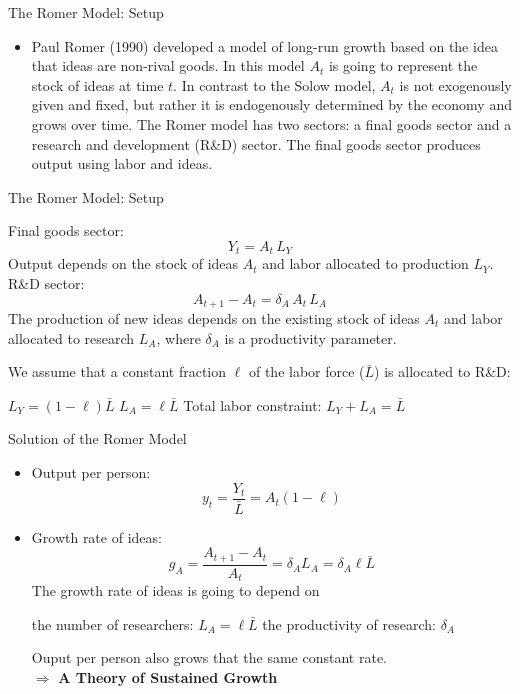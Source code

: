 \documentclass[10pt,aspectratio=169]{beamer}
\begin{document}
\begin{frame}{The Romer Model: Setup}
\begin{itemize}
    \item Paul Romer (1990) developed a model of long-run growth based on the idea that ideas are non-rival goods.
    \itemvso In this model $A_t$ is going to represent the stock of ideas at time $t$.
    \itemvso In contrast to the Solow model, $A_t$ is not exogenously given and fixed, but rather it is endogenously determined by the economy and grows over time.
    \itemvso The Romer model has two sectors: a final goods sector and a research and development (R\&D) sector.
    \itemvso The final goods sector produces output using labor and ideas.
\end{itemize}
\end{frame}

\begin{frame}{The Romer Model: Setup}
\begin{itemize}
    \itemvso Final goods sector:
     \[
        Y_t = A_t\,L_Y
    \]
    Output depends on the stock of ideas $A_t$ and labor allocated to production $L_Y$.
    \itemvso R\&D sector: 
    \[
        A_{t+1}-A_t = \delta_A\,A_t\,L_A
    \]
    The production of new ideas depends on the existing stock of ideas $A_t$ and labor allocated to research $L_A$, where $\delta_A$ is a productivity parameter.

    \itemvso We assume that a constant fraction $\ell$ of the labor force ($\bar{L}$) is allocated to R\&D:
    \begin{itemize}
        \itemvso $L_Y = (1-\ell)\bar{L}$
        \itemvso $L_A = \ell \bar{L}$
        \itemvso Total labor constraint: $L_Y + L_A = \bar{L}$
    \end{itemize}
\end{itemize}
\end{frame}


\begin{frame}{Solution of the Romer Model}
    \begin{itemize}
        \item Output per person:
        \[
        y_t = \frac{Y_t}{\bar{L}} = A_t (1-\ell)
        \]
        \item Growth rate of ideas:
        \[
        g_A = \frac{A_{t+1}-A_t}{A_t} = \delta_A L_A = \delta_A \ell \bar{L}
        \]
        The growth rate of ideas is going to depend on
            \begin{itemize}
                \itemvso the number of researchers: $L_A = \ell \bar{L}$
                \itemvso the productivity of research: $\delta_A$
            \end{itemize} 
        \itemvso Ouput per person also grows that the same constant rate.\\
        \vspace{0.5cm}
        $\Rightarrow$ \textbf{A Theory of Sustained Growth}
    \end{itemize}
    
\end{frame}
\end{document}
